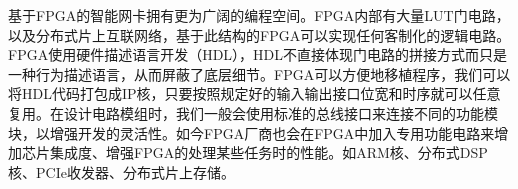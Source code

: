 基于FPGA的智能网卡拥有更为广阔的编程空间。FPGA内部有大量LUT门电路，以及分布式片上互联网络，基于此结构的FPGA可以实现任何客制化的逻辑电路。FPGA使用硬件描述语言开发（HDL），HDL不直接体现门电路的拼接方式而只是一种行为描述语言，从而屏蔽了底层细节。FPGA可以方便地移植程序，我们可以将HDL代码打包成IP核，只要按照规定好的输入输出接口位宽和时序就可以任意复用。在设计电路模组时，我们一般会使用标准的总线接口来连接不同的功能模块，以增强开发的灵活性。如今FPGA厂商也会在FPGA中加入专用功能电路来增加芯片集成度、增强FPGA的处理某些任务时的性能。如ARM核、分布式DSP核、PCIe收发器、分布式片上存储。















%






\label{chap232}%

